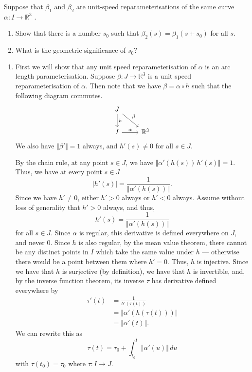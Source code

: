 \documentclass[12 pt, letterpaper]{hmcpset}
\begin{document}
\pagebreak

\begin{problem}[Problem 4.]
	Suppose that $\beta_{1}$  and  $\beta_{2}$  are unit-speed reparameterisations of the same curve $\alpha : I \to \mathbb{R}^{3}$ .
	\begin{enumerate}
		\item Show that there is a number $s_{0}$ such that $\beta_{2}(s) = \beta_{1}(s + s_{0})$ for all $s$.
		\item What is the geometric significance of $s_{0}$?
	\end{enumerate}
\end{problem}

\begin{solution}
	\begin{enumerate}
		\item First we will show that any unit speed reparameterisation of $\alpha$ is an arc length parameterisation. Suppose $\beta : J \to \mathbb{R}^{3}$ is a unit speed reparameterisation of $\alpha$. Then note that we have $\beta = \alpha \circ h$ such that the following diagram commutes.
			\[
				\begin{tikzcd}
					J \ar[rd, "\beta"] \ar[d, "h"] \\
					I \ar[r, "\alpha"] & \mathbb{R}^{3}
				\end{tikzcd}
			\]
			We also have $\Vert \beta' \Vert = 1$ always, and $h'(s) \neq 0$ for all $s \in J$.

			By the chain rule, at any point $s \in J$, we have $\Vert \alpha'(h(s)) \, h'(s) \Vert = 1$. Thus, we have at every point $s \in J$
			\[
				\vert h'(s) \vert = \frac{1}{\Vert \alpha'(h(s)) \Vert}.
			\]
			Since we have $h' \neq 0$, either $h' > 0$ always or $h' < 0$ always. Assume without loss of generality that $h' > 0$ always, and thus,
			\[
				h'(s) = \frac{1}{\Vert \alpha'(h(s)) \Vert}
			\]
			for all $s \in J$. Since $\alpha$ is regular, this derivative is defined everywhere on $J$, and never $0$. Since $h$ is also regular, by the mean value theorem, there cannot be any distinct points in $I$ which take the same value under $h$ --- otherwise there would be a point between them where $h' = 0$. Thus, $h$ is injective. Since we have that $h$ is surjective (by definition), we have that $h$ is invertible, and, by the inverse function theorem, its inverse $\tau$ has derivative defined everywhere by
			\[
				\begin{split}
					\tau'(t) & = \frac{1}{h'(\tau(t))} \\
						 & = \Vert \alpha'(h(\tau(t))) \Vert \\
						 & = \Vert \alpha'(t) \Vert.
				\end{split}
			\]
			We can rewrite this as
			\[
				\tau(t) = \tau_{0} + \int_{t_{0}}^{t} \Vert \alpha'(u) \Vert \, du
			\]
			with $\tau(t_{0}) = \tau_{0}$ where $\tau : I \to J$. 


\end{enumerate}
\end{solution}
\end{document}
